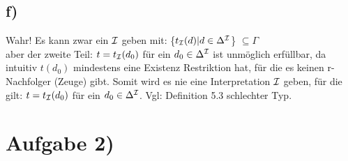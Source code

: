 \documentclass[12pt]{article}
\begin{document}
\subsection*{f)}
Wahr!  Es kann zwar ein $\mathcal{I}$ geben mit: \{$t_{\mathcal{I}}(d) | d \in \Delta^{\mathcal{I}} $\}  $\subseteq \Gamma$\\
aber der zweite Teil: $t = t_{\mathcal{I}}(d_0)$ für ein $d_0 \in \Delta^{\mathcal{I}} $ ist unmöglich erfüllbar, da intuitiv $t(d_0)$ mindestens eine Existenz Restriktion hat, für die es keinen r-Nachfolger (Zeuge) gibt. Somit wird es nie eine Interpretation $\mathcal{I}$ geben, für die gilt:  $t = t_{\mathcal{I}}(d_0)$ für ein $d_0 \in \Delta^{\mathcal{I}} $.  Vgl: Definition 5.3 schlechter Typ.


\section*{Aufgabe 2)}
\end{document}
